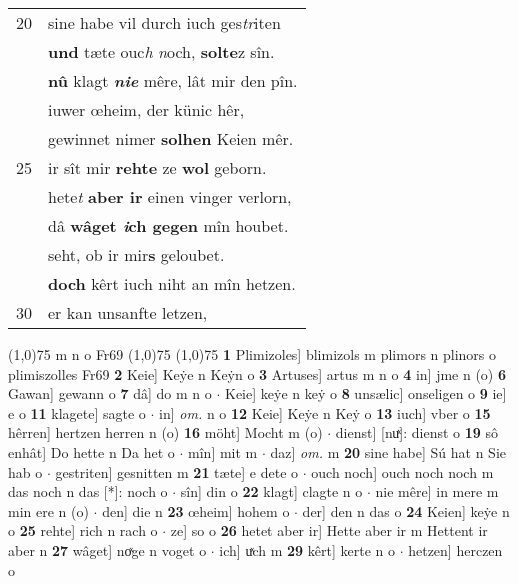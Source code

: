 \documentclass[8pt,a4paper,notitlepage]{article}
\begin{document}
\begin{table}[ht]
\begin{minipage}[t]{0.5\linewidth}
\begin{tabular}{rl}
20 & sine habe vil durch iuch ges\textit{tr}iten\\ 
 & \textbf{und} tæte ouc\textit{h} \textit{n}och, \textbf{solte}z sîn.\\ 
 & \textbf{nû} klagt \textit{\textbf{nie}} mêre, lât mir den pîn.\\ 
 & iuwer œheim, der künic hêr,\\ 
 & gewinnet nimer \textbf{solhen} Keien mêr.\\ 
25 & ir sît mir \textbf{rehte} ze \textbf{wol} geborn.\\ 
 & hete\textit{t} \textbf{aber ir} einen vinger verlorn,\\ 
 & dâ \textbf{wâget \textit{i}ch gegen} mîn houbet.\\ 
 & seht, ob ir mir\textbf{s} geloubet.\\ 
 & \textbf{doch} kêrt iuch niht an mîn hetzen.\\ 
30 & er kan unsanfte letzen,\\ 
\end{tabular}
\scriptsize
\line(1,0){75} \newline
m n o Fr69 \newline
\line(1,0){75} \newline
\newline
\line(1,0){75} \newline
\textbf{1} Plimizoles] blimizols m plimors n plinors o plimiszolles Fr69 \textbf{2} Keie] Keẏe n Keẏn o \textbf{3} Artuses] artus m n o \textbf{4} in] jme n (o) \textbf{6} Gawan] gewann o \textbf{7} dâ] do m n o  $\cdot$ Keie] keẏe n keẏ o \textbf{8} unsælic] onseligen o \textbf{9} ie] e o \textbf{11} klagete] sagte o  $\cdot$ in] \textit{om.} n o \textbf{12} Keie] Keẏe n Keẏ o \textbf{13} iuch] vber o \textbf{15} hêrren] hertzen herren n (o) \textbf{16} möht] Mocht m (o)  $\cdot$ dienst] [nuͯ]: dienst o \textbf{19} sô enhât] Do hette n Da het o  $\cdot$ mîn] mit m  $\cdot$ daz] \textit{om.} m \textbf{20} sine habe] Sú hat n Sie hab o  $\cdot$ gestriten] gesnitten m \textbf{21} tæte] e dete o  $\cdot$ ouch noch] ouch noch noch m das noch n das [*]: noch o  $\cdot$ sîn] din o \textbf{22} klagt] clagte n o  $\cdot$ nie mêre] in mere m min ere n (o)  $\cdot$ den] die n \textbf{23} œheim] hohem o  $\cdot$ der] den n das o \textbf{24} Keien] keẏe n o \textbf{25} rehte] rich n rach o  $\cdot$ ze] so o \textbf{26} hetet aber ir] Hette aber ir m Hettent ir aber n \textbf{27} wâget] noͯge n voget o  $\cdot$ ich] uͯch m \textbf{29} kêrt] kerte n o  $\cdot$ hetzen] herczen o \newline
\end{minipage}
\end{table}
\end{document}
